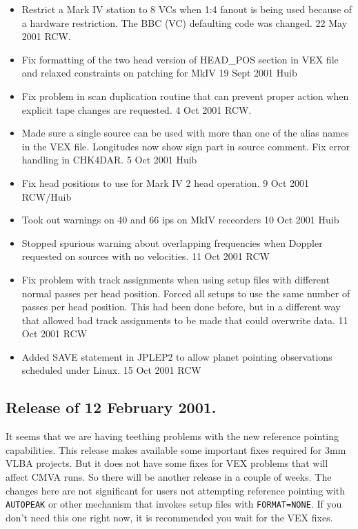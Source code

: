 \documentclass{report}
\begin{document}
\begin{itemize}
\item  Restrict a Mark IV station to 8 VCs when 1:4 fanout is being
       used because of a hardware restriction.  The BBC (VC) defaulting
       code was changed.  22 May 2001 RCW.

\item  Fix formatting of the two head version of HEAD\_POS section in
       VEX file and relaxed constraints on patching for MkIV
       19 Sept 2001 Huib

\item  Fix problem in scan duplication routine that can prevent proper
       action when explicit tape changes are requested.  4 Oct 2001 RCW.

\item  Made sure a single source can be used with more than one of the
       alias names in the VEX file. Longitudes now show sign part in
       source comment. Fix error handling in CHK4DAR.
       5 Oct 2001 Huib

\item  Fix head positions to use for Mark IV 2 head operation.
       9 Oct 2001  RCW/Huib

\item  Took out warnings on 40 and 66 ips on MkIV receorders 10 Oct
       2001 Huib

\item  Stopped spurious warning about overlapping frequencies when
       Doppler requested on sources with no velocities.  11 Oct 2001 RCW

\item  Fix problem with track assignments when using setup files with
       different normal passes per head position.  Forced all setups
       to use the same number of passes per head position.  This had
       been done before, but in a different way that allowed bad track
       assignments to be made that could overwrite data.  11 Oct 2001 RCW

\item  Added SAVE statement in JPLEP2 to allow planet pointing observations
       scheduled under Linux.  15 Oct 2001 RCW

\end{itemize}

\subsection{\label{SSSEC:09FEB2001}Release of 12 February 2001.}

It seems that we are having teething problems with the new reference
pointing capabilities.  This release makes available some important
fixes required for 3mm VLBA projects.  But it does not have some fixes
for VEX problems that will affect CMVA runs.  So there will be another
release in a couple of weeks.  The changes here are not significant
for users not attempting reference pointing with {\tt AUTOPEAK} or
other mechanism that invokes setup files with {\tt FORMAT=NONE}.  If
you don't need this one right now, it is recommended you wait for
the VEX fixes.
\end{document}
